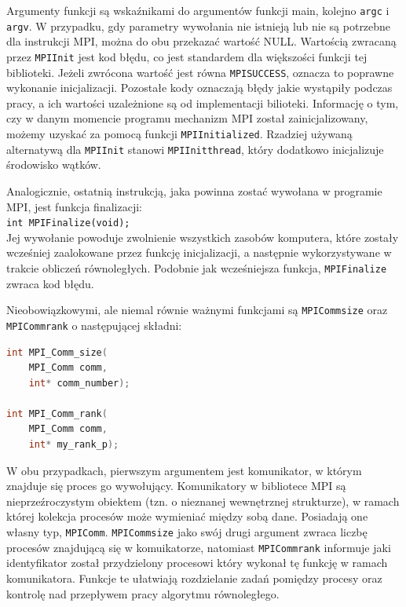 Argumenty funkcji są wskaźnikami do argumentów funkcji main, kolejno \texttt{argc} i \texttt{argv}. W przypadku, gdy parametry wywołania nie istnieją lub nie są potrzebne dla instrukcji MPI, można do obu przekazać wartość NULL. Wartością zwracaną przez \texttt{MPI\textunderscore Init} jest kod błędu, co jest standardem dla większości funkcji tej biblioteki. Jeżeli zwrócona wartość jest równa \texttt{MPI\textunderscore SUCCESS}, oznacza to poprawne wykonanie inicjalizacji. Pozostałe kody oznaczają błędy jakie wystąpiły podczas pracy, a ich wartości uzależnione są od implementacji bilioteki. Informację o tym, czy w danym momencie programu mechanizm MPI został zainicjalizowany, możemy uzyskać za pomocą funkcji \texttt{MPI\textunderscore Initialized}. Rzadziej używaną alternatywą dla \texttt{MPI\textunderscore Init} stanowi \texttt{MPI\textunderscore Init\textunderscore thread}, który dodatkowo inicjalizuje środowisko wątków.

Analogicznie, ostatnią instrukcją, jaka powinna zostać wywołana w programie MPI, jest funkcja finalizacji: \\

\texttt{int MPI\textunderscore Finalize(void);} \\

Jej wywołanie powoduje zwolnienie wszystkich zasobów komputera, które zostały wcześniej zaalokowane przez funkcję inicjalizacji, a następnie wykorzystywane w trakcie obliczeń równoległych. Podobnie jak wcześniejsza funkcja, \texttt{MPI\textunderscore Finalize} zwraca kod błędu.

Nieobowiązkowymi, ale niemal równie ważnymi funkcjami są \texttt{MPI\textunderscore Comm\textunderscore size} oraz \texttt{MPI\textunderscore Comm\textunderscore rank} o następującej składni:

\begin{lstlisting}[language=C]
int MPI_Comm_size(
	MPI_Comm comm,
	int* comm_number);

int MPI_Comm_rank(
	MPI_Comm comm,
	int* my_rank_p);
\end{lstlisting}
 
 W obu przypadkach, pierwszym argumentem jest komunikator, w którym znajduje się proces go wywołujący. Komunikatory w bibliotece MPI są nieprzeźroczystym obiektem (tzn. o nieznanej wewnętrznej strukturze), w ramach której kolekcja procesów może wymieniać między sobą dane. Posiadają one własny typ, \texttt{MPI\textunderscore Comm}. \texttt{MPI\textunderscore Comm\textunderscore size} jako swój drugi argument zwraca liczbę procesów znajdującą się w komuikatorze, natomiast \texttt{MPI\textunderscore Comm\textunderscore rank} informuje jaki identyfikator został przydzielony procesowi który wykonał tę funkcję w ramach komunikatora. Funkcje te ułatwiają rozdzielanie zadań pomiędzy procesy oraz kontrolę nad przepływem pracy algorytmu równoległego.
 
